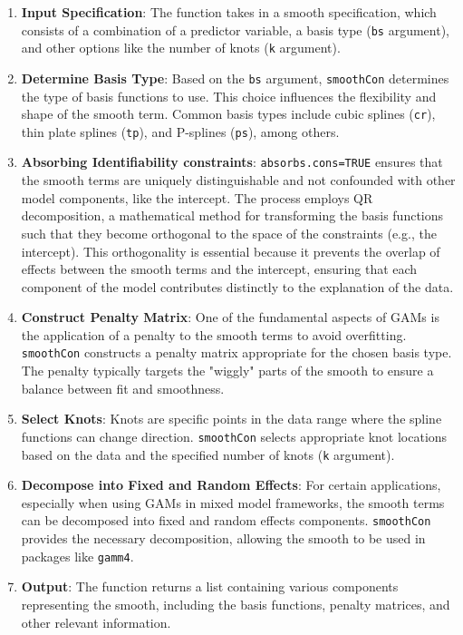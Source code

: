 \documentclass[12pt, twoside,hidelinks]{article}
\theoremstyle{definition}
\numberwithin{equation}{section}
\begin{document}
\begin{enumerate}[label=\arabic*., left=0pt]
    \item \textbf{Input Specification}: The function takes in a smooth specification, which consists of a combination of a predictor variable, a basis type (\texttt{bs} argument), and other options like the number of knots (\texttt{k} argument).
    
    \item \textbf{Determine Basis Type}: Based on the \texttt{bs} argument, \texttt{smoothCon} determines the type of basis functions to use. This choice influences the flexibility and shape of the smooth term. Common basis types include cubic splines (\texttt{cr}), thin plate splines (\texttt{tp}), and P-splines (\texttt{ps}), among others.

    \item \textbf{Absorbing Identifiability constraints}: \texttt{absorbs.cons=TRUE} ensures that the smooth terms are uniquely distinguishable and not confounded with other model components, like the intercept. The process employs QR decomposition, a mathematical method for transforming the basis functions such that they become orthogonal to the space of the constraints (e.g., the intercept). This orthogonality is essential because it prevents the overlap of effects between the smooth terms and the intercept, ensuring that each component of the model contributes distinctly to the explanation of the data. 

    
    \item \textbf{Construct Penalty Matrix}: One of the fundamental aspects of GAMs is the application of a penalty to the smooth terms to avoid overfitting. \texttt{smoothCon} constructs a penalty matrix appropriate for the chosen basis type. The penalty typically targets the "wiggly" parts of the smooth to ensure a balance between fit and smoothness.
    
    \item \textbf{Select Knots}: Knots are specific points in the data range where the spline functions can change direction. \texttt{smoothCon} selects appropriate knot locations based on the data and the specified number of knots (\texttt{k} argument).
    
    \item \textbf{Decompose into Fixed and Random Effects}: For certain applications, especially when using GAMs in mixed model frameworks, the smooth terms can be decomposed into fixed and random effects components. \texttt{smoothCon} provides the necessary decomposition, allowing the smooth to be used in packages like \texttt{gamm4}.
    
    \item \textbf{Output}: The function returns a list containing various components representing the smooth, including the basis functions, penalty matrices, and other relevant information.
\end{enumerate}
\end{document}
